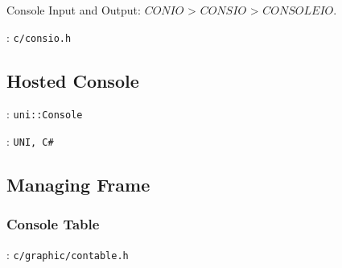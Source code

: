 
Console Input and Output: $CONIO$ > $CONSIO$ > $CONSOLEIO$.

: \verb`c/consio.h`

\subsection{Hosted Console}

: \verb|uni::Console|

: \verb|UNI, C#|


\subsection{Managing Frame}

\subsubsection{Console Table}
: \verb`c/graphic/contable.h`

